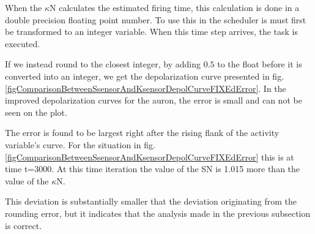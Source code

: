 When the $\kappa$N calculates the estimated firing time, this calculation is done in a double precision floating point number. 
To use this in the scheduler is must first be transformed to an integer variable. When this time step arrives, the task is executed.

If we instead round to the closest integer, by adding $0.5$ to the float before it is converted into an integer, we get the depolarization curve presented in fig. \ref{figComparisonBetweenSsensorAndKsensorDepolCurveFIXEdError}.
In the improved depolarization curves for the auron, the error is small and can not be seen on the plot.

The error is found to be largest right after the rising flank of the activity variable's curve. %
For the situation in fig. \ref{figComparisonBetweenSsensorAndKsensorDepolCurveFIXEdError} this is at time t=3000.
At this time iteration the value of the SN is 1.015 more than the value of the $\kappa$N. 

This deviation is substantially smaller that the deviation originating from the rounding error, but it indicates that the analysis made in the previous subsection is correct. %





